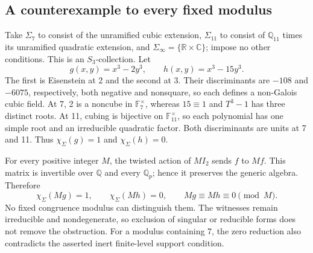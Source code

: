 \documentclass[10pt]{article}
\begin{document}
\subsection*{A counterexample to every fixed modulus}
Take \(\Sigma_7\) to consist of the unramified cubic extension, \(\Sigma_{11}\) to consist of \(\mathbb Q_{11}\) times its unramified quadratic extension, and \(\Sigma_\infty=\{\mathbb R\times\mathbb C\}\); impose no other conditions. This is an \(S_3\)-collection. Let \[g(x,y)=x^3-2y^3,\qquad h(x,y)=x^3-15y^3.\] The first is Eisenstein at 2 and the second at 3. Their discriminants are \(-108\) and \(-6075\), respectively, both negative and nonsquare, so each defines a non-Galois cubic field. At 7, 2 is a noncube in \(\mathbb F_7^\times\), whereas \(15\equiv1\) and \(T^3-1\) has three distinct roots. At 11, cubing is bijective on \(\mathbb F_{11}^\times\), so each polynomial has one simple root and an irreducible quadratic factor. Both discriminants are units at 7 and 11. Thus \(\chi_\Sigma(g)=1\) and \(\chi_\Sigma(h)=0\).\par
For every positive integer \(M\), the twisted action of \(M I_2\) sends \(f\) to \(Mf\). This matrix is invertible over \(\mathbb Q\) and every \(\mathbb Q_p\); hence it preserves the generic algebra. Therefore \[\chi_\Sigma(Mg)=1,\qquad \chi_\Sigma(Mh)=0,
 \qquad Mg\equiv Mh\equiv0\pmod M.\] No fixed congruence modulus can distinguish them. The witnesses remain irreducible and nondegenerate, so exclusion of singular or reducible forms does not remove the obstruction. For a modulus containing 7, the zero reduction also contradicts the asserted inert finite-level support condition.\par
\end{document}
